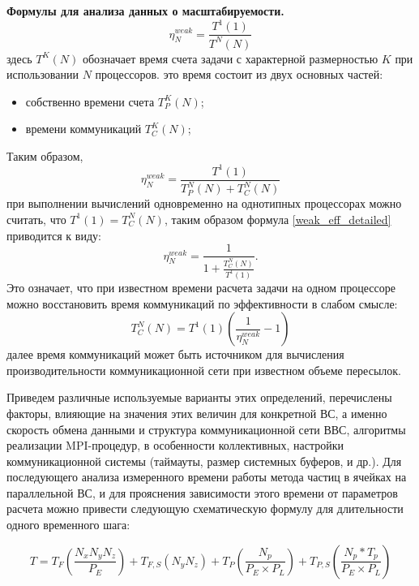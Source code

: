 \textbf{Формулы для анализа данных о масштабируемости.}
\begin{equation}
\label{weak_eff}
\eta^{weak}_N = \frac{T^1(1)}{T^N(N)}
\end{equation}
здесь $T^K(N)$ обозначает время счета задачи с характерной размерностью $K$ при использовании $N$ процессоров.
это время состоит из двух основных частей:
\begin{itemize}
	\item собственно времени счета $T^K_{P}(N)$;
	\item времени коммуникаций $T^K_C(N)$;
\end{itemize}
Таким образом,
\begin{equation}
\label{weak_eff_detailed}
\eta^{weak}_N = \frac{T^1(1)}{T^N_{P}(N)+T^N_C(N)}
\end{equation}
при выполнении вычислений одновременно на однотипных процессорах
можно считать, что $T^1(1) = T^N_C(N)$, таким образом формула
\ref{weak_eff_detailed} приводится к виду:
\begin{equation}
\label{weak_eff_detailed-time}
\eta^{weak}_N = \frac{1}{1+ \frac{T^N_{C}(N)}{T^1(1)}}.
\end{equation}
Это означает, что при известном времени расчета задачи на одном процессоре можно восстановить время коммуникаций по эффективности в слабом смысле:
\begin{equation}
\label{comm_time_from_efficiency}
T^N_{C}(N) = T^1(1) \left(\frac{1}{\eta^{weak}_N} - 1\right)
\end{equation}
далее время коммуникаций может быть источником для вычисления производительности коммуникационной сети при известном объеме пересылок.

Приведем различные используемые варианты этих определений, перечислены факторы, влияющие на  значения этих величин для конкретной ВС, а именно скорость обмена данными и структура коммуникационной сети ВВС, алгоритмы реализации MPI-процедур, в особенности коллективных, настройки коммуникационной системы (таймауты, размер системных буферов, и др.).
Для последующего анализа измеренного времени работы метода частиц в ячейках на параллельной ВС, и для прояснения зависимости этого времени от параметров расчета можно привести следующую схематическую формулу для длительности одного временного шага:

\begin{equation}
\label{PIC-timestep}
T=T_{F} \left ( \frac{N_x N_y N_z }{P_E}\right )+ T_{F,S}\left (N_y N_z\right ) + T_P\left(\frac{N_p}{P_E\times P_L}\right) +T_{P,S}\left (\frac{N_p*T_p}{P_E\times P_L}\right)
\end{equation}

